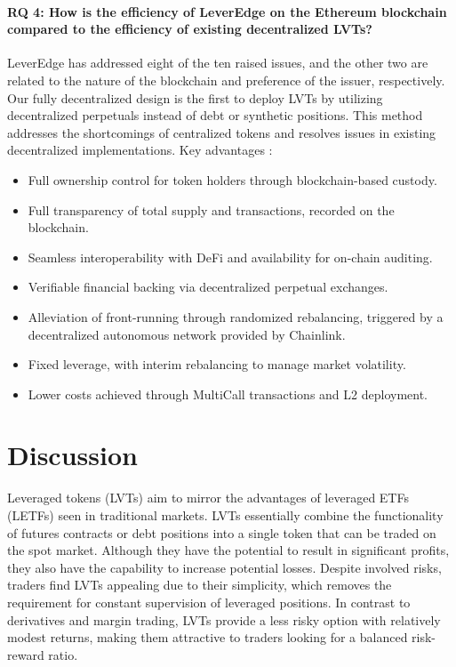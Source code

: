 \paragraph{RQ 4: How is the efficiency of LeverEdge on the Ethereum blockchain compared to the efficiency of existing decentralized LVTs?}  LeverEdge has addressed eight of the ten raised issues, and the other two are related to the nature of the blockchain and preference of the issuer, respectively. Our fully decentralized design is the first to deploy LVTs by utilizing decentralized perpetuals instead of debt or synthetic positions. This method addresses the shortcomings of centralized tokens and resolves issues in existing decentralized implementations. Key advantages :
\begin{itemize}
	\item Full ownership control for token holders through blockchain-based custody.
	\item Full transparency of total supply and transactions, recorded on the blockchain.
	\item Seamless interoperability with DeFi and availability for on-chain auditing.
	\item Verifiable financial backing via decentralized perpetual exchanges.
	\item Alleviation of front-running through randomized rebalancing, triggered by a decentralized autonomous network provided by Chainlink.
	\item Fixed leverage, with interim rebalancing to manage market volatility.
	\item Lower costs achieved through MultiCall transactions and L2 deployment.
\end{itemize}

\section{Discussion}
Leveraged tokens (LVTs) aim to mirror the advantages of leveraged ETFs (LETFs) seen in traditional markets. LVTs essentially combine the functionality of futures contracts or debt positions into a single token that can be traded on the spot market. Although they have the potential to result in significant profits, they also have the capability to increase potential losses. Despite involved risks, traders find LVTs appealing due to their simplicity, which removes the requirement for constant supervision of leveraged positions. In contrast to derivatives and margin trading, LVTs provide a less risky option with relatively modest returns, making them attractive to traders looking for a balanced risk-reward ratio.


